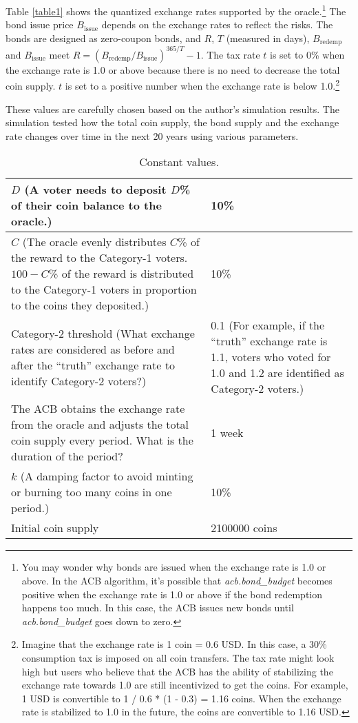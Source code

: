 \documentclass[dvipdfmx,a4paper]{article}
\begin{document}
Table \ref{table1} shows the quantized exchange rates supported by the oracle.\footnote{You may wonder why bonds are issued when the exchange rate is 1.0 or above. In the ACB algorithm, it's possible that \textit{acb.bond\_budget} becomes positive when the exchange rate is 1.0 or above if the bond redemption happens too much. In this case, the ACB issues new bonds until \textit{acb.bond\_budget} goes down to zero.} The bond issue price $B_{\mathrm{issue}}$ depends on the exchange rates to reflect the risks. The bonds are designed as zero-coupon bonds, and $R$, $T$ (measured in days), $B_{\mathrm{redemp}}$ and $B_{\mathrm{issue}}$ meet $R=(B_{\mathrm{redemp}}/B_{\mathrm{issue}})^{365/T}-1$. The tax rate $t$ is set to 0\% when the exchange rate is 1.0 or above because there is no need to decrease the total coin supply. $t$ is set to a positive number when the exchange rate is below 1.0.\footnote{Imagine that the exchange rate is 1 coin = 0.6 USD. In this case, a 30\% consumption tax is imposed on all coin transfers. The tax rate might look high but users who believe that the ACB has the ability of stabilizing the exchange rate towards 1.0 are still incentivized to get the coins. For example, 1 USD is convertible to 1 / 0.6 * (1 - 0.3) = 1.16 coins. When the exchange rate is stabilized to 1.0 in the future, the coins are convertible to 1.16 USD.}

These values are carefully chosen based on the author's simulation results. The simulation tested how the total coin supply, the bond supply and the exchange rate changes over time in the next 20 years using various parameters.

\begin{table}[htb]
\begin{center}
\caption{Constant values.}\vspace{2ex}
\begin{tabular}{p{26em}|p{10em}}\hline
$D$ (A voter needs to deposit $D$\% of their coin balance to the oracle.) & 10\%\\\hline
$C$ (The oracle evenly distributes $C$\% of the reward to the Category-1 voters. $100-C$\% of the reward is distributed to the Category-1 voters in proportion to the coins they deposited.) & 10\%\\\hline
Category-2 threshold (What exchange rates are considered as before and after the ``truth'' exchange rate to identify Category-2 voters?) & 0.1 (For example, if the ``truth'' exchange rate is 1.1, voters who voted for 1.0 and 1.2 are identified as Category-2 voters.)\\\hline
The ACB obtains the exchange rate from the oracle and adjusts the total coin supply every period. What is the duration of the period? & 1 week\\\hline
$k$ (A damping factor to avoid minting or burning too many coins in one period.) & 10\%\\\hline
Initial coin supply & 2100000 coins\\\hline
\end{tabular}
\label{table2}
\end{center}
\end{table}
\end{document}
